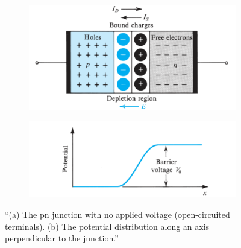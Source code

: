 \begin{figure}[ht] 
    \begin{subfigure}[b]{0.5\linewidth}
        \centering
        \includegraphics[width=1\linewidth]{img/1/pn-junction-OC.png}
        \caption{} 
        \label{fig:pn-junction-OC} 
    \end{subfigure}%
    \begin{subfigure}[b]{0.5\linewidth}
        \centering
        \includegraphics[width=1\linewidth]{img/1/pn-junction-potential-distrib.png} 
        \caption{} 
        \label{fig:pn-junction-potential-distrib} 
    \end{subfigure}  
    \caption{``(a) The pn junction with no applied voltage (open-circuited terminals). (b) The potential distribution along an axis perpendicular to the junction.''\cite{sedra-smith:microelectronic-circuits}}
    \label{fig:pn-junction}
\end{figure}

